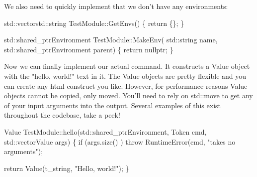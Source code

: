\begin{page}
We also need to quickly implement that we don't have any environments:
\begin{code}
std::vector\<std::string\> TestModule::GetEnvs()
\{
    return \{\};
\}

std::shared_ptr\<Environment\> TestModule::MakeEnv(
    std::string name, std::shared_ptr\<Environment\> parent)
\{
    return nullptr;
\}
\end{code}

Now we can finally implement our actual command. It constructs a Value object with the "hello, world!" text in it. The Value objects are pretty flexible and you can create any html construct you like. However, for performance reasons Value objects cannot be copied, only moved. You'll need to rely on std::move to get any of your input arguments into the output. Several examples of this exist throughout the codebase, take a peek!

\begin{code}
Value TestModule::hello(std::shared_ptr\<Environment\>, Token cmd,
        std::vector\<Value\> args)
\{
   if (args.size() )
       throw RuntimeError(cmd, "takes no arguments");
   
   return Value(t_string, "Hello, world!");
\}
\end{code}

\end{page}